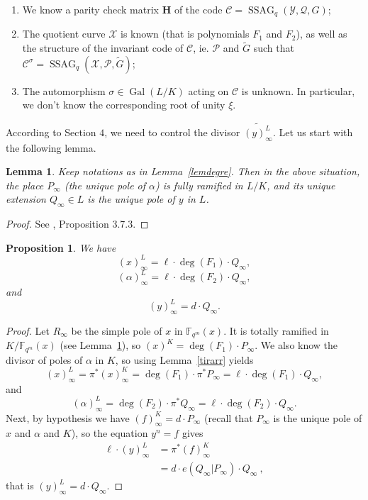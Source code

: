 \documentclass[10pt]{article}
\newtheorem{prop1}[thm]{Proposition}
\newtheorem{lem1}[thm]{Lemma}
\theoremstyle{definition}
\theoremstyle{definition}
\theoremstyle{definition}
\newcommand{\s}{\vspace{0.3cm}}
\newcommand{\cd}{\cdot}
\newcommand{\fqm}{\mathbb{F}_{q^m}}
\newcommand{\X}{\mathcal{X}}
\newcommand{\Y}{\mathcal{Y}}
\newcommand{\PR}{\mathcal{P}}
\newcommand{\QR}{\mathcal{Q}}
\newcommand{\Gal}{\operatorname{Gal}}
\newcommand{\ssag}{\operatorname{SSAG}}
\begin{document}
\s

\begin{enumerate}
\item We know a parity check matrix $\mathbf{H}$ of the code $\mathcal{C} = \ssag_q(\Y,\QR,G)$;
\item The quotient curve $\X$ is known (that is polynomials $F_1$ and $F_2$), as well as the structure of the invariant code of $\mathcal{C}$, ie. $\PR$ and $\tilde{G}$ such that $\mathcal{C}^{\sigma} = \ssag_q(\X,\PR,\tilde{G})$;
\item The automorphism $\sigma \in\Gal(L/K)$ acting on $\mathcal{C}$ is unknown. In particular, we don't know the corresponding root of unity $\xi$.
\end{enumerate}

\s


According to Section $4$, we need to control the divisor $\widetilde{(y)^L_{\infty}}$. Let us start with the following lemma.

\s

\begin{lem1} \label{ramification}
Keep notations as in Lemma~\ref{lemdegre}. Then in the above situation, the place $P_{\infty}$ (the unique pole of $\alpha$) is fully ramified in $L/K$, and its unique extension $Q_{\infty} \in L$ is the unique pole of $y$ in $L$. 
\end{lem1}

\s

\begin{proof}
See \cite{Sti}, Proposition 3.7.3.
\end{proof}

\s

\begin{prop1} \label{propcle}
We have
\[(x)^L_{\infty} = \ell \cd \deg(F_1) \cd Q_{\infty},\]
\[(\alpha)^L_{\infty} = \ell \cd \deg(F_2) \cd Q_{\infty},\]
and
\[(y)^L_{\infty} = d \cd Q_{\infty}.\]
\end{prop1}

\s

\begin{proof}
Let $R_{\infty}$ be the simple pole of $x$ in $\fqm(x)$. It is totally ramified in $K/\fqm(x)$ (see Lemma~\ref{ramification}), so $(x)^K = \deg(F_1) \cd P_{\infty}$. We also know the divisor of poles of $\alpha$ in $K$, so using Lemma~\ref{tirarr} yields
\[(x)^L_{\infty} = \pi^*(x)^K_{\infty} = \deg(F_1) \cd \pi^*P_{\infty} = \ell \cd \deg(F_1) \cd Q_{\infty},\]
and
\[(\alpha)^L_{\infty} = \deg(F_2) \cd \pi^*Q_{\infty} = \ell \cd \deg(F_2) \cd Q_{\infty}.\]
Next, by hypothesis we have $(f)^K_{\infty} = d \cd P_{\infty}$ (recall that $P_{\infty}$ is the unique pole of $x$ and $\alpha$ and $K$), so the equation $y^n=f$ gives
\begin{align*} \ell \cd (y)^L_{\infty} &= \pi^*(f)^K_{\infty} \\
&= d \cd e(Q_{\infty}|P_{\infty}) \cd Q_{\infty} \ ,
\end{align*}
that is $(y)^L_{\infty} = d \cd Q_{\infty}.$
\end{proof}
\end{document}
